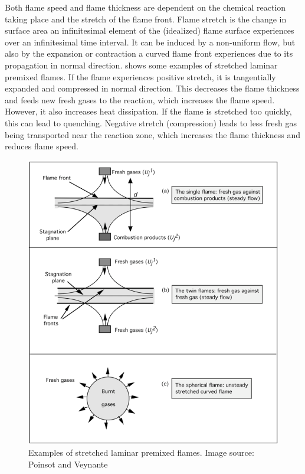 %
Both flame speed and flame thickness are dependent on the chemical reaction
taking place and the stretch of the flame front.
%
Flame stretch is the change in surface area an infinitesimal element of the
(idealized) flame surface experiences over an infinitesimal time interval.
%
It can be induced by a non-uniform flow, but also by the expansion or
contraction a curved flame front experiences due to its propagation in normal
direction.
%
 shows some examples of stretched laminar
premixed flames.
%
If the flame experiences positive stretch, it is tangentially expanded and
compressed in normal direction.
%
This decreases the flame thickness and feeds new fresh gases to the reaction,
which increases the flame speed.
%
However, it also increases heat dissipation.
%
If the flame is stretched too quickly, this can lead to quenching.
%
Negative stretch (compression) leads to less fresh gas being transported near
the reaction zone, which increases the flame thickness and reduces flame speed.
%
\begin{figure}[tp]
    \centering
    \includegraphics[width=\textwidth]{figures/stretched_premixed_flames.png}
    \caption{Examples of stretched laminar premixed flames. Image source:
    Poinsot and Veynante~\cite{Poinsot2012}}
    \label{fig:stretched_premixed_flames}
\end{figure}

